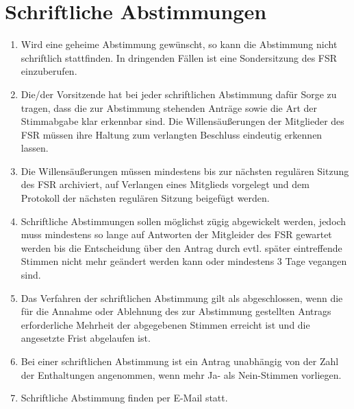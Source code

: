 \documentclass[
	a4paper,
	12pt,
	oneside,
	parskip=half-,
	pagesize,
	headsepline,
	german,
	ngerman
]{scrartcl}
\begin{document}
\section{Schriftliche Abstimmungen}
\label{sec:schriftlich}
\begin{enumerate}
	\item Wird eine geheime Abstimmung gewünscht, so kann die Abstimmung nicht schriftlich stattfinden. In dringenden Fällen ist eine Sondersitzung des FSR einzuberufen.
	\item Die/der Vorsitzende hat bei jeder schriftlichen Abstimmung dafür Sorge zu tragen, dass die zur Abstimmung stehenden Anträge sowie die Art der Stimmabgabe klar erkennbar sind. Die Willensäußerungen der Mitglieder des FSR müssen ihre Haltung zum verlangten Beschluss eindeutig erkennen lassen.
	\item Die Willensäußerungen müssen mindestens bis zur nächsten regulären Sitzung des FSR archiviert, auf Verlangen eines Mitglieds vorgelegt und dem Protokoll der nächsten regulären Sitzung beigefügt werden.
	\item Schriftliche Abstimmungen sollen möglichst zügig abgewickelt werden, jedoch muss mindestens so lange auf Antworten der Mitgleider des FSR gewartet werden bis die Entscheidung über den Antrag durch evtl. später eintreffende Stimmen nicht mehr geändert werden kann oder mindestens 3 Tage vegangen sind.
	\item Das Verfahren der schriftlichen Abstimmung gilt als abgeschlossen, wenn die für die Annahme oder Ablehnung des zur Abstimmung gestellten Antrags erforderliche Mehrheit der abgegebenen Stimmen erreicht ist und die angesetzte Frist abgelaufen ist.
	\item Bei einer schriftlichen Abstimmung ist ein Antrag unabhängig von der Zahl der Enthaltungen angenommen, wenn mehr Ja- als Nein-Stimmen vorliegen.
	\item Schriftliche Abstimmung finden per E-Mail statt.
	
\end{enumerate}
\end{document}
